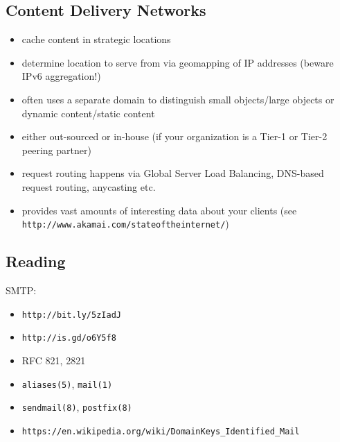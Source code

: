\documentclass[xga]{xdvislides}
\begin{document}
\subsection{Content Delivery Networks}
\begin{itemize}
	\item cache content in strategic locations
	\item determine location to serve from via geomapping of IP
		addresses (beware IPv6 aggregation!)
	\item often uses a separate domain to distinguish small
		objects/large objects or dynamic content/static content
	\item either out-sourced or in-house (if your organization is a
		Tier-1 or Tier-2 peering partner)
	\item request routing happens via Global Server Load Balancing,
		DNS-based request routing, anycasting etc.
	\item provides vast amounts of interesting data about your clients
		(see \verb+http://www.akamai.com/stateoftheinternet/+)
\end{itemize}



\subsection{Reading}
SMTP:
\begin{itemize}
	\item \verb+http://bit.ly/5zIadJ+
	\item \verb+http://is.gd/o6Y5f8+
	\item RFC 821, 2821
	\item \verb+aliases(5)+, \verb+mail(1)+
	\item \verb+sendmail(8)+, \verb+postfix(8)+
	\item \verb+https://en.wikipedia.org/wiki/DomainKeys_Identified_Mail+
\end{itemize}
\end{document}
